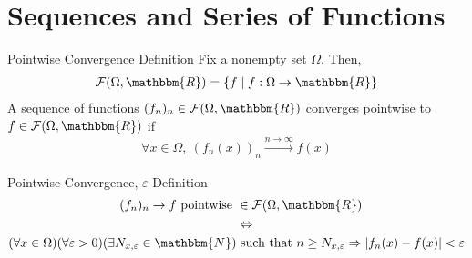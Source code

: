 \documentclass[10pt]{extarticle}
\newcommand{\N}{\mathbbm{N}}
\newcommand{\R}{\mathbbm{R}}
\begin{document}
  \section{Sequences and Series of Functions}%
  \begin{problem}{Pointwise Convergence Definition}
    Fix a nonempty set $\Omega$. Then,
    \begin{align*}
      \mathcal{F}(\Omega,\R) = \left\{f\mid f: \Omega \rightarrow \R\right\}
    \end{align*}
    A sequence of functions $(f_n)_n\in \mathcal{F}(\Omega,\R)$ converges pointwise to $f\in \mathcal{F}(\Omega,\R)$ if
    \begin{align*}
      \forall x\in\Omega,~(f_n(x))_n \xrightarrow{n\rightarrow\infty}f(x)
    \end{align*}
  \end{problem}
  \begin{problem}{Pointwise Convergence, $\varepsilon$ Definition}
    \begin{align*}
      (f_n)_n \rightarrow f \text{ pointwise } &\in \mathcal{F}(\Omega,\R)\\
                                               &\Leftrightarrow\\
      (\forall x\in\Omega)(\forall \varepsilon > 0) (\exists N_{x,\varepsilon}\in\N) &\text{ such that } n\geq N_{x,\varepsilon} \Rightarrow \left|f_n(x) - f(x)\right| < \varepsilon
    \end{align*}
  \end{problem}
\end{document}
